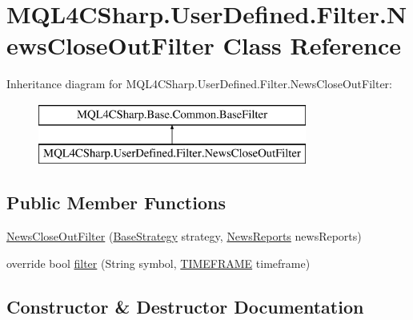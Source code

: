 \hypertarget{class_m_q_l4_c_sharp_1_1_user_defined_1_1_filter_1_1_news_close_out_filter}{}\section{M\+Q\+L4\+C\+Sharp.\+User\+Defined.\+Filter.\+News\+Close\+Out\+Filter Class Reference}
\label{class_m_q_l4_c_sharp_1_1_user_defined_1_1_filter_1_1_news_close_out_filter}
Inheritance diagram for M\+Q\+L4\+C\+Sharp.\+User\+Defined.\+Filter.\+News\+Close\+Out\+Filter\+:\begin{figure}[H]
\begin{center}
\leavevmode
\includegraphics[height=2.000000cm]{class_m_q_l4_c_sharp_1_1_user_defined_1_1_filter_1_1_news_close_out_filter}
\end{center}
\end{figure}
\subsection*{Public Member Functions}
\begin{DoxyCompactItemize}
\item 
\hyperlink{class_m_q_l4_c_sharp_1_1_user_defined_1_1_filter_1_1_news_close_out_filter_a856f604d623fb4f4840b049fbb27e3d8}{News\+Close\+Out\+Filter} (\hyperlink{class_m_q_l4_c_sharp_1_1_base_1_1_base_strategy}{Base\+Strategy} strategy, \hyperlink{class_m_q_l4_c_sharp_1_1_user_defined_1_1_input_1_1_news_reports}{News\+Reports} news\+Reports)
\item 
override bool \hyperlink{class_m_q_l4_c_sharp_1_1_user_defined_1_1_filter_1_1_news_close_out_filter_a63d3774335f436e86261bfb3c61d2803}{filter} (String symbol, \hyperlink{namespace_m_q_l4_c_sharp_1_1_base_1_1_enums_a838810aaa87c63c12737408dba8c0b35}{T\+I\+M\+E\+F\+R\+A\+ME} timeframe)
\end{DoxyCompactItemize}


\subsection{Constructor \& Destructor Documentation}
